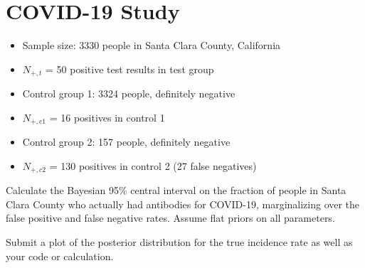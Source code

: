 \section{COVID-19 Study}
\begin{itemize}
    \item Sample size: 3330 people in Santa Clara County, California
    \item $N_{+,t}$ = 50 positive test results in test group
    \item Control group 1: 3324 people, definitely negative
    \item $N_{+,c1}$ = 16 positives in control 1
    \item Control group 2: 157 people, definitely negative
    \item $N_{+,c2}$ = 130 positives in control 2 (27 false negatives)
\end{itemize}

Calculate the Bayesian 95\% central interval on the fraction of people in Santa Clara County who actually had antibodies for COVID-19, marginalizing over the false positive and false negative rates. Assume flat priors on all parameters.




Submit a plot of the posterior distribution for the true incidence rate as well as your code or calculation.
